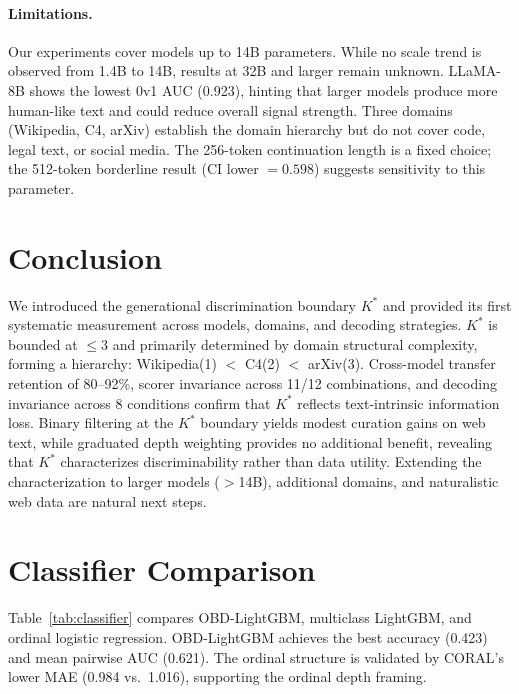 \documentclass[11pt]{article}
\begin{document}
\paragraph{Limitations.} Our experiments cover models up to 14B parameters. While no scale trend is observed from 1.4B to 14B, results at 32B and larger remain unknown. LLaMA-8B shows the lowest 0v1 AUC (0.923), hinting that larger models produce more human-like text and could reduce overall signal strength. Three domains (Wikipedia, C4, arXiv) establish the domain hierarchy but do not cover code, legal text, or social media. The 256-token continuation length is a fixed choice; the 512-token borderline result (CI lower $= 0.598$) suggests sensitivity to this parameter.

\section{Conclusion}

We introduced the generational discrimination boundary $K^*$ and provided its first systematic measurement across models, domains, and decoding strategies. $K^*$ is bounded at $\leq 3$ and primarily determined by domain structural complexity, forming a hierarchy: Wikipedia(1) $<$ C4(2) $<$ arXiv(3). Cross-model transfer retention of 80--92\%, scorer invariance across 11/12 combinations, and decoding invariance across 8 conditions confirm that $K^*$ reflects text-intrinsic information loss. Binary filtering at the $K^*$ boundary yields modest curation gains on web text, while graduated depth weighting provides no additional benefit, revealing that $K^*$ characterizes discriminability rather than data utility. Extending the characterization to larger models ($>$14B), additional domains, and naturalistic web data are natural next steps.

\appendix

\section{Classifier Comparison}
\label{app:classifier}

Table~\ref{tab:classifier} compares OBD-LightGBM, multiclass LightGBM, and ordinal logistic regression. OBD-LightGBM achieves the best accuracy (0.423) and mean pairwise AUC (0.621). The ordinal structure is validated by CORAL's lower MAE (0.984 vs.\ 1.016), supporting the ordinal depth framing.
\end{document}
